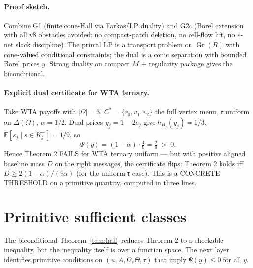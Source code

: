 \documentclass[11pt]{article}
\theoremstyle{definition}
\theoremstyle{remark}
\newcommand{\eps}{\varepsilon}
\newcommand{\E}{\mathbb{E}}
\begin{document}
\paragraph{Proof sketch.} Combine G1 (finite cone-Hall via Farkas/LP
duality) and G2c (Borel extension with all v8 obstacles avoided:
no compact-patch deletion, no cell-flow lift, no $\eps$-net slack
discipline). The primal LP is a transport problem on $\operatorname{Gr}(R)$ with
cone-valued conditional constraints; the dual is a conic separation
with bounded Borel prices $y$. Strong duality on compact $M$ + regularity
package gives the biconditional.

\paragraph{Explicit dual certificate for WTA ternary.} Take WTA payoffs
with $|\Omega|=3$, $C^* = \{v_0, v_1, v_2\}$ the full vertex menu,
$\tau$ uniform on $\Delta(\Omega)$, $\alpha = 1/2$. Dual prices
$y_j = 1 - 2e_j$ give $h_{B_j}(y_j) = 1/3$, $\E[s_j\mid s\in K_j^-] = 1/9$,
so
\[
\Psi(y) = (1-\alpha)\cdot\tfrac{4}{9} = \tfrac{2}{9} \;>\; 0.
\]
Hence Theorem 2 FAILS for WTA ternary uniform — but with positive
aligned baseline mass $D$ on the right messages, the certificate
flips: Theorem 2 holds iff $D \ge 2(1-\alpha)/(9\alpha)$ (for the
uniform-τ case). This is a CONCRETE THRESHOLD on a primitive
quantity, computed in three lines.

\section{Primitive sufficient classes}\label{sec:primitive}

The biconditional Theorem~\ref{thm:hall} reduces Theorem 2 to a
checkable inequality, but the inequality itself is over a function
space. The next layer identifies primitive conditions on
$(u, A, \Omega, \Theta, \tau)$ that imply $\Psi(y)\le 0$ for all $y$.
\end{document}
